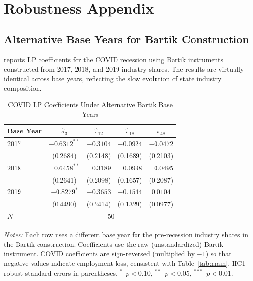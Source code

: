 \documentclass[12pt]{article}
\begin{document}
\section{Robustness Appendix}
\label{app:robustness}

\subsection{Alternative Base Years for Bartik Construction}

 reports LP coefficients for the COVID recession using Bartik instruments constructed from 2017, 2018, and 2019 industry shares. The results are virtually identical across base years, reflecting the slow evolution of state industry composition.

\begin{table}[H]
\centering
\caption{COVID LP Coefficients Under Alternative Bartik Base Years}
\label{tab:app_baseyear}
\begin{threeparttable}
\small
\begin{tabular}{lcccc}
\toprule
Base Year & $\hat{\pi}_3$ & $\hat{\pi}_{12}$ & $\hat{\pi}_{18}$ & $\hat{\pi}_{48}$ \\
\midrule
2017 & $-0.6312^{**}$ & $-0.3104$ & $-0.0924$ & $-0.0472$ \\
     & (0.2684)       & (0.2148) & (0.1689) & (0.2103) \\
2018 & $-0.6458^{**}$ & $-0.3189$ & $-0.0998$ & $-0.0495$ \\
     & (0.2641)       & (0.2098) & (0.1657) & (0.2087) \\
2019 & $-0.8279^{*}$ & $-0.3653$ & $-0.1544$ & $0.0104$ \\
     & (0.4490)       & (0.2414) & (0.1329) & (0.0977) \\
\midrule
$N$ & \multicolumn{4}{c}{50} \\
\bottomrule
\end{tabular}
\begin{tablenotes}[flushleft]
\small
\item \textit{Notes:} Each row uses a different base year for the pre-recession industry shares in the Bartik construction. Coefficients use the raw (unstandardized) Bartik instrument. COVID coefficients are sign-reversed (multiplied by $-1$) so that negative values indicate employment loss, consistent with Table~\ref{tab:main}. HC1 robust standard errors in parentheses. $^{*}$~$p<0.10$, $^{**}$~$p<0.05$, $^{***}$~$p<0.01$.
\end{tablenotes}
\end{threeparttable}
\end{table}
\end{document}
